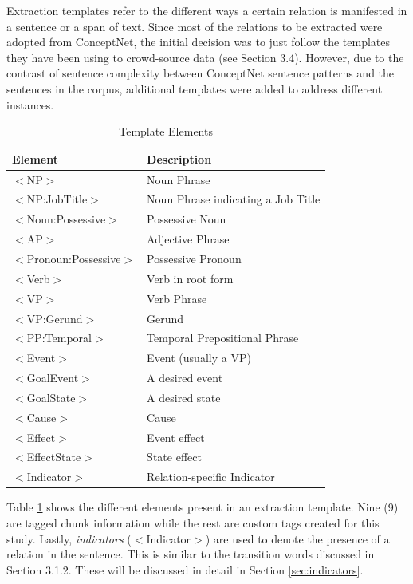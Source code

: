 Extraction templates refer to the different ways a certain relation is manifested in a sentence or a span of text. Since most of the relations to be extracted were adopted from ConceptNet, the initial decision was to just follow the templates they have been using to crowd-source data (see Section 3.4). However, due to the contrast of sentence complexity between ConceptNet sentence patterns and the sentences in the corpus, additional templates were added to address different instances. 

\begin{table}[H]   %
\centering
\caption{Template Elements} \vspace{0.25em}
\begin{tabular}{|p{4cm}|p{6.5cm}|} \hline
\textbf{Element} & \textbf{Description} \\ \hline
$<$NP$>$					& Noun Phrase \\ \hline
$<$NP:JobTitle$>$			& Noun Phrase indicating a Job Title \\ \hline
$<$Noun:Possessive$>$		& Possessive Noun \\ \hline
$<$AP$>$					& Adjective Phrase \\ \hline
$<$Pronoun:Possessive$>$	& Possessive Pronoun \\ \hline
$<$Verb$>$					& Verb in root form \\ \hline
$<$VP$>$					& Verb Phrase \\ \hline
$<$VP:Gerund$>$				& Gerund \\ \hline
$<$PP:Temporal$>$			& Temporal Prepositional Phrase \\ \hline
$<$Event$>$					& Event (usually a VP) \\ \hline
$<$GoalEvent$>$				& A desired event \\ \hline
$<$GoalState$>$				& A desired state \\ \hline
$<$Cause$>$					& Cause \\ \hline
$<$Effect$>$				& Event effect \\ \hline
$<$EffectState$>$			& State effect \\ \hline
$<$Indicator$>$				& Relation-specific Indicator \\ \hline
\end{tabular}
\label{tab:templateelements}
\end{table}

Table \ref{tab:templateelements} shows the different elements present in an extraction template. Nine (9) are tagged chunk information while the rest are custom tags created for this study. Lastly, \textit{indicators} ($<$Indicator$>$) are used to denote the presence of a relation in the sentence. This is similar to the transition words discussed in Section 3.1.2. These will be discussed in detail in Section  \ref{sec:indicators}.


